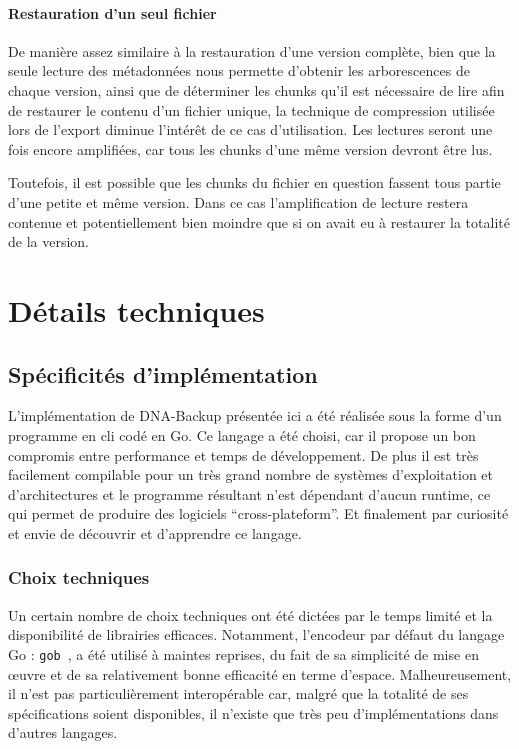 \documentclass[a4paper]{report}
\begin{document}
\subsubsection{Restauration d'un seul fichier}

De manière assez similaire à la restauration d'une version complète,
bien que la seule lecture des métadonnées nous permette d'obtenir les arborescences de chaque version,
ainsi que de déterminer les chunks qu'il est nécessaire de lire
afin de restaurer le contenu d'un fichier unique,
la technique de compression utilisée lors de l'export diminue l'intérêt de ce cas d'utilisation.
Les lectures seront une fois encore amplifiées, car tous les chunks d'une même version devront être lus.

Toutefois, il est possible que les chunks du fichier en question fassent tous partie d'une petite et même version.
Dans ce cas l'amplification de lecture restera contenue
et potentiellement bien moindre que si on avait eu à restaurer la totalité de la version.


\chapter{Détails techniques}

\section{Spécificités d'implémentation}

L'implémentation de DNA-Backup présentée ici a été réalisée sous la forme d'un programme en \ac{cli} codé en Go.
Ce langage a été choisi, car il propose un bon compromis entre performance et temps de développement.
De plus il est très facilement compilable pour un très grand nombre de systèmes d'exploitation et d'architectures
et le programme résultant n'est dépendant d'aucun runtime,
ce qui permet de produire des logiciels ``cross-plateform''.
Et finalement par curiosité et envie de découvrir et d'apprendre ce langage.

\subsection{Choix techniques}

Un certain nombre de choix techniques ont été dictées par le temps limité et la disponibilité de librairies efficaces.
Notamment, l'encodeur par défaut du langage Go : \verb|gob|~\cite{pike2011gob},
a été utilisé à maintes reprises, du fait de sa simplicité de mise en œuvre
et de sa relativement bonne efficacité en terme d'espace.
Malheureusement, il n'est pas particulièrement interopérable car,
malgré que la totalité de ses spécifications soient disponibles,
il n'existe que très peu d'implémentations dans d'autres langages.
\end{document}

